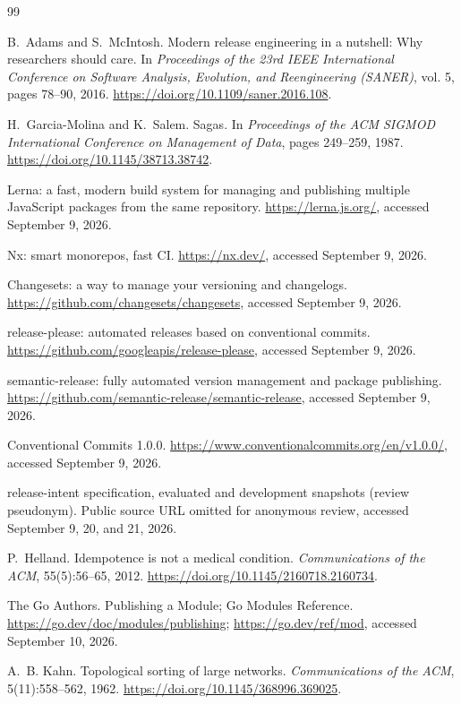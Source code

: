 \begin{thebibliography}{99}

B.~Adams and S.~McIntosh.
Modern release engineering in a nutshell: Why researchers should care.
In \emph{Proceedings of the 23rd IEEE International Conference on
Software Analysis, Evolution, and Reengineering (SANER)}, vol. 5, pages 78--90, 2016.
\url{https://doi.org/10.1109/saner.2016.108}.

H.~Garcia-Molina and K.~Salem.
Sagas.
In \emph{Proceedings of the ACM SIGMOD International Conference on
Management of Data}, pages 249--259, 1987.
\url{https://doi.org/10.1145/38713.38742}.

Lerna: a fast, modern build system for managing and publishing multiple
JavaScript packages from the same repository.
\url{https://lerna.js.org/}, accessed September 9, 2026.

Nx: smart monorepos, fast CI.
\url{https://nx.dev/}, accessed September 9, 2026.

Changesets: a way to manage your versioning and changelogs.
\url{https://github.com/changesets/changesets}, accessed September 9, 2026.

release-please: automated releases based on conventional commits.
\url{https://github.com/googleapis/release-please}, accessed September 9, 2026.

semantic-release: fully automated version management and package
publishing.
\url{https://github.com/semantic-release/semantic-release},
accessed September 9, 2026.

Conventional Commits 1.0.0.
\url{https://www.conventionalcommits.org/en/v1.0.0/}, accessed September 9, 2026.

\lang{} release-intent specification, evaluated and development snapshots
(review pseudonym).
Public source URL omitted for anonymous review,
accessed September 9, 20, and 21, 2026.

P.~Helland.
Idempotence is not a medical condition.
\emph{Communications of the ACM}, 55(5):56--65, 2012.
\url{https://doi.org/10.1145/2160718.2160734}.

The Go Authors.
Publishing a Module; Go Modules Reference.
\url{https://go.dev/doc/modules/publishing}; \url{https://go.dev/ref/mod},
accessed September 10, 2026.

A.~B. Kahn.
Topological sorting of large networks.
\emph{Communications of the ACM}, 5(11):558--562, 1962.
\url{https://doi.org/10.1145/368996.369025}.


\end{thebibliography}

